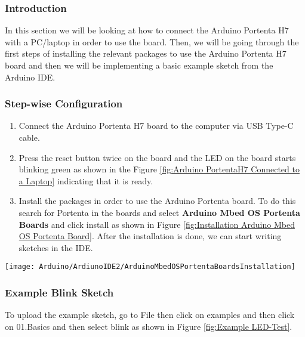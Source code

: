 \subsubsection{Introduction}

In this section we will be looking at how to connect the Arduino Portenta H7 with a PC/laptop in order to use the board. Then, we will be going through the first steps of installing the relevant packages to use the Arduino Portenta H7 board and then we will be implementing a basic example sketch from the Arduino IDE.

\subsubsection{Step-wise Configuration}

\begin{enumerate}
    
    \item Connect the Arduino Portenta H7 board to the computer via USB Type-C cable.
    \item Press the reset button twice on the board and the LED on the board starts blinking green as shown in the Figure \ref{fig:Arduino PortentaH7 Connected to a Laptop} indicating that it is ready.
    
    
    
    \item Install the packages in order to use the Arduino Portenta board. To do this search for Portenta in the boards and select \textbf{Arduino Mbed OS Portenta Boards} and click install as shown in Figure \ref{fig:Installation Arduino Mbed OS Portenta Board}. After the installation is done, we can start writing sketches in the IDE.
\end{enumerate}	

\begin{center}
    \label{fig:Installation Arduino Mbed OS Portenta Board}
    \texttt{[image: Arduino/ArdiunoIDE2/ArduinoMbedOSPortentaBoardsInstallation]}
\end{center}


\subsubsection{Example Blink Sketch}

To upload the example sketch, go to File then click on examples and then click on 01.Basics and then select blink as shown in Figure \ref{fig:Example LED-Test}.

